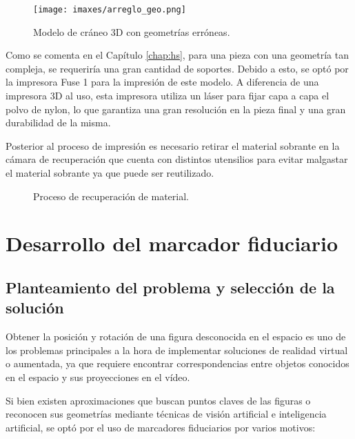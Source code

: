 \begin{figure}
	\centering
	\texttt{[image: imaxes/arreglo\_geo.png]}
	\caption{Modelo de cráneo 3D con geometrías erróneas.}
	\label{fig:arr_geo}
\end{figure}

Como se comenta en el Capítulo \ref{chap:hs}, para una pieza con una geometría tan compleja, se requeriría una gran cantidad de soportes. Debido a esto, se optó por la impresora Fuse 1 para la impresión de este modelo. A diferencia de una impresora 3D al uso, esta impresora utiliza un láser para fijar capa a capa el polvo de nylon, lo que garantiza una gran resolución en la pieza final y una gran durabilidad de la misma.

Posterior al proceso de impresión es necesario retirar el material sobrante en la cámara de recuperación que cuenta con distintos utensilios para evitar malgastar el material sobrante ya que puede ser reutilizado.

\begin{figure}%
	\centering
	\qquad
	\caption{Proceso de recuperación de material.}%
	\label{fig:limpieza}%
\end{figure}

\section{Desarrollo del marcador fiduciario}
\label{sec:marcador_fiduciario}

\subsection{Planteamiento del problema y selección de la solución}
Obtener la posición y rotación de una figura desconocida en el espacio es uno de los problemas principales a la hora de implementar soluciones de realidad virtual o aumentada, ya que requiere encontrar correspondencias entre objetos conocidos en el espacio y sus proyecciones en el vídeo.

Si bien existen aproximaciones que buscan puntos claves de las figuras o reconocen sus geometrías mediante técnicas de visión artificial e inteligencia artificial, se optó por el uso de  marcadores fiduciarios por varios motivos:

